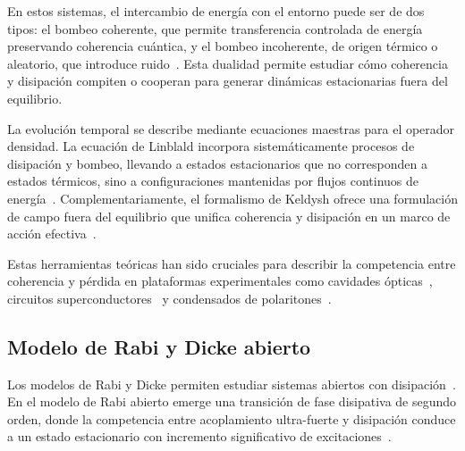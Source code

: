 \documentclass[onecolumn,notitlepage,letterpaper,aps,pra,12pt]{article}
\numberwithin{equation}{section}
\begin{document}
En estos sistemas, el intercambio de energía con el entorno puede ser de dos tipos: el bombeo coherente, que permite transferencia controlada de energía preservando coherencia cuántica, y el bombeo incoherente, de origen térmico o aleatorio, que introduce ruido~\cite{carmichael2013}. Esta dualidad permite estudiar cómo coherencia y disipación compiten o cooperan para generar dinámicas estacionarias fuera del equilibrio.

La evolución temporal se describe mediante ecuaciones maestras para el operador densidad. La ecuación de Linblald incorpora sistemáticamente procesos de disipación y bombeo, llevando a estados estacionarios que no corresponden a estados térmicos, sino a configuraciones mantenidas por flujos continuos de energía~\cite{Fazio2025}. Complementariamente, el formalismo de Keldysh ofrece una formulación de campo fuera del equilibrio que unifica coherencia y disipación en un marco de acción efectiva~\cite{Sieberer2016,chakraborty2018}.

Estas herramientas teóricas han sido cruciales para describir la competencia entre coherencia y pérdida en plataformas experimentales como cavidades ópticas~\cite{torres2013}, circuitos superconductores~\cite{feigelman2000} y condensados de polaritones~\cite{dunnet2016}. 

\subsection{Modelo de Rabi y Dicke abierto}

Los modelos de Rabi y Dicke permiten estudiar sistemas abiertos con disipación~\cite{Lyu2024,damanet2019}. En el modelo de Rabi abierto emerge una transición de fase disipativa de segundo orden, donde la competencia entre acoplamiento ultra-fuerte y disipación conduce a un estado estacionario con incremento significativo de excitaciones~\cite{hwang2018}.
\end{document}
